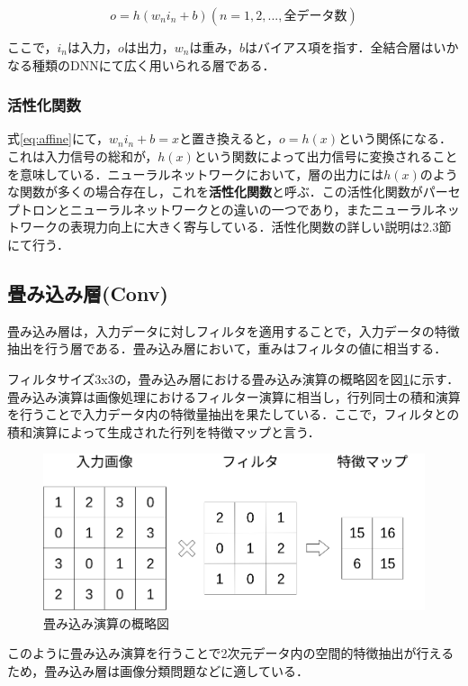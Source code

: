\documentclass[a4j, 11pt]{jreport}
\begin{document}
\begin{equation}
 o = h(w_n i_n + b)　(n = 1, 2, ... , 全データ数)
 \label{eq:affine}
\end{equation}

ここで，$i_n$は入力，$o$は出力，$w_n$は重み，$b$はバイアス項を指す．全結合層はいかなる種類のDNNにて広く用いられる層である．
\subsubsection{活性化関数}
式\ref{eq:affine}にて，$w_n i_n + b = x$と置き換えると，$o = h(x)$という関係になる．これは入力信号の総和が，$h(x)$という関数によって出力信号に変換されることを意味している．ニューラルネットワークにおいて，層の出力には$h(x)$のような関数が多くの場合存在し，これを\textbf{活性化関数}と呼ぶ．この活性化関数がパーセプトロンとニューラルネットワークとの違いの一つであり，またニューラルネットワークの表現力向上に大きく寄与している．活性化関数の詳しい説明は2.3節にて行う．
\subsection{畳み込み層(Conv)}
畳み込み層は，入力データに対しフィルタを適用することで，入力データの特徴抽出を行う層である．畳み込み層において，重みはフィルタの値に相当する．

フィルタサイズ3x3の，畳み込み層における畳み込み演算の概略図を図\ref{fig:conv2d}に示す．畳み込み演算は画像処理におけるフィルター演算に相当し，行列同士の積和演算を行うことで入力データ内の特徴量抽出を果たしている．ここで，フィルタとの積和演算によって生成された行列を特徴マップと言う．

\begin{figure}[htbp]
 \centering
 \includegraphics[width=0.9\hsize, keepaspectratio]{images/drawio/conv2d.png}
 \caption{畳み込み演算の概略図}
 \label{fig:conv2d}
\end{figure}

このように畳み込み演算を行うことで2次元データ内の空間的特徴抽出が行えるため，畳み込み層は画像分類問題などに適している．
\end{document}
